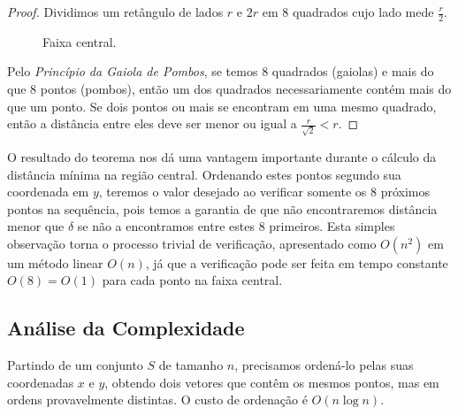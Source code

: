 \documentclass{homework}
\begin{document}
	\begin{proof}
		Dividimos um retângulo de lados $r$ e $2r$ em $8$ quadrados cujo lado mede $\frac{r}{2}$.\par
		
		\begin{figure}[H]
			\centering
			
			\caption{Faixa central.}
			\label{fig:3.5}
		\end{figure}
		
		Pelo \textit{Princípio da Gaiola de Pombos}, se temos $8$ quadrados (gaiolas) e mais do que $8$ pontos (pombos), então um dos quadrados necessariamente contém mais do que um ponto. Se dois pontos ou mais se encontram em uma mesmo quadrado, então a distância entre eles deve ser menor ou igual a $\frac{r}{\sqrt{2}} < r$.\par
	\end{proof}

	O resultado do teorema nos dá uma vantagem importante durante o cálculo da distância mínima na região central. Ordenando estes pontos segundo sua coordenada em $y$, teremos o valor desejado ao verificar somente os $8$ próximos pontos na sequência, pois temos a garantia de que não encontraremos distância menor que $\delta$ se não a encontramos entre estes $8$ primeiros. Esta simples observação torna o processo trivial de verificação, apresentado como $O(n^2)$ em um método linear $O(n)$, já que a verificação pode ser feita em tempo constante $O(8) = O(1)$ para cada ponto na faixa central.\par
	
	\subsection*{Análise da Complexidade}
	
	Partindo de um conjunto $S$ de tamanho $n$, precisamos ordená-lo pelas suas coordenadas $x$ e $y$, obtendo dois vetores que contêm os mesmos pontos, mas em ordens provavelmente distintas. O custo de ordenação é {$O\left(n \log n\right)$}.\par
	
\end{document}
